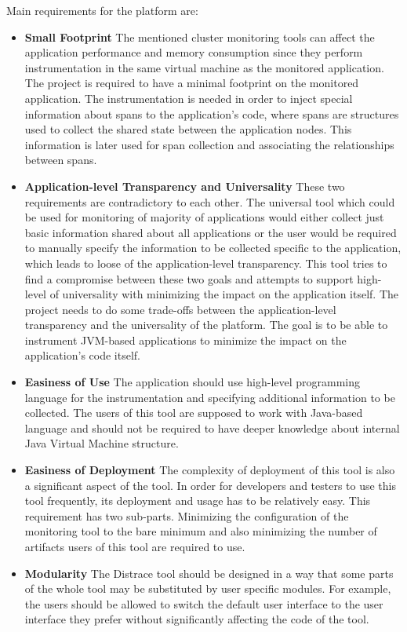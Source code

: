 Main requirements for the platform are:
\begin{itemize}
	\item \textbf{Small Footprint} \newline
	 The mentioned cluster monitoring tools can affect the application performance and memory consumption since they perform instrumentation in the same virtual machine as the monitored application. The project is required to have a minimal footprint on the monitored application. The instrumentation is needed in order to inject special information about spans to the application's code, where spans are structures used to collect the shared state between the application nodes. This information is later used for span collection and associating the relationships between spans.
	\item \textbf{Application-level Transparency and Universality} \newline
	These two requirements are contradictory to each other. The universal tool which could be used for monitoring of majority of applications would either collect just basic information shared about all applications or the user would be required to manually specify the information to be collected specific to the application, which leads to loose of the application-level transparency. This tool tries to find a compromise between these two goals and attempts to support high-level of universality with minimizing the impact on the application itself.
	The project needs to do some trade-offs between the application-level transparency and the universality of the platform. The goal is to be able to instrument JVM-based applications to minimize the impact on the application's code itself.
	\item \textbf{Easiness of Use} \newline
	The application should use high-level programming language for the instrumentation and specifying additional information to be collected. The users of this tool are supposed to work with Java-based language and should not be required to have deeper knowledge about internal Java Virtual Machine structure.
	\item \textbf{Easiness of Deployment} \newline
	The complexity of deployment of this tool is also a significant aspect of the tool. In order for developers and testers to use this tool frequently, its deployment and usage has to be relatively easy. This requirement has two sub-parts. Minimizing the configuration of the monitoring tool to the bare minimum and also minimizing the number of artifacts users of this tool are required to use.
	\item \textbf{Modularity} \newline
	The Distrace tool should be designed in a way that some parts of the whole tool may be substituted by user specific modules. For example, the users should be allowed to switch the default user interface to the user interface they prefer without significantly affecting the code of the tool.
\end{itemize}

